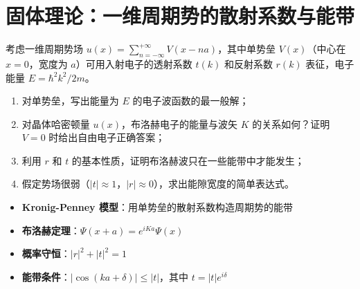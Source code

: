 \section{固体理论：一维周期势的散射系数与能带}
\label{sec:kronig-penney-scattering}

\begin{modelbox}
考虑一维周期势场 $u(x)=\sum_{n=-\infty}^{+\infty}V(x-na)$，其中单势垒 $V(x)$（中心在 $x=0$，宽度为 $a$）可用入射电子的透射系数 $t(k)$ 和反射系数 $r(k)$ 表征，电子能量 $E=\hbar^2k^2/2m$。
\begin{enumerate}
    \item 对单势垒，写出能量为 $E$ 的电子波函数的最一般解；
    \item 对晶体哈密顿量 $u(x)$，布洛赫电子的能量与波矢 $K$ 的关系如何？证明 $V=0$ 时给出自由电子正确答案；
    \item 利用 $r$ 和 $t$ 的基本性质，证明布洛赫波只在一些能带中才能发生；
    \item 假定势场很弱（$|t|\approx1$，$|r|\approx0$），求出能隙宽度的简单表达式。
\end{enumerate}
\end{modelbox}

\begin{tipbox}[考点快速分析]
\begin{itemize}
    \item \textbf{Kronig-Penney 模型}：用单势垒的散射系数构造周期势的能带
    \item \textbf{布洛赫定理}：$\Psi(x+a)=e^{iKa}\Psi(x)$
    \item \textbf{概率守恒}：$|r|^2+|t|^2=1$
    \item \textbf{能带条件}：$|\cos(ka+\delta)|\le|t|$，其中 $t=|t|e^{i\delta}$
\end{itemize}
\end{tipbox}

